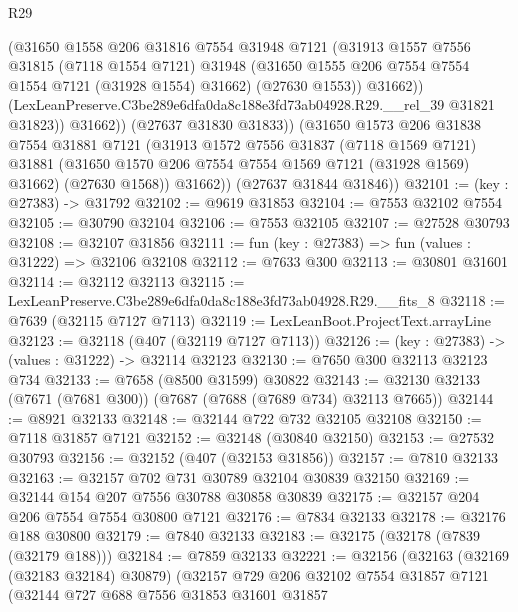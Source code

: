 \begin{lexlean}{R29}
\begin{coremodule}
                  (@31650
                    @1558
                    @206
                    @31816
                    @7554
                    @31948
                    @7121
                    (@31913
                      @1557
                      @7556
                      @31815
                      (@7118 @1554 @7121)
                      @31948
                      (@31650 @1555 @206 @7554 @7554 @1554 @7121 (@31928 @1554) @31662)
                      (@27630 @1553))
                    @31662))
                (LexLeanPreserve.C3be289e6dfa0da8c188e3fd73ab04928.R29.__rel_39 @31821 @31823))
              @31662))
          (@27637 @31830 @31833))
        (@31650
          @1573
          @206
          @31838
          @7554
          @31881
          @7121
          (@31913
            @1572
            @7556
            @31837
            (@7118 @1569 @7121)
            @31881
            (@31650 @1570 @206 @7554 @7554 @1569 @7121 (@31928 @1569) @31662)
            (@27630 @1568))
          @31662))
      (@27637 @31844 @31846))
@32101 := (key : @27383) -> @31792
@32102 := @9619 @31853
@32104 := @7553 @32102 @7554
@32105 := @30790 @32104
@32106 := @7553 @32105
@32107 := @27528 @30793
@32108 := @32107 @31856
@32111 := fun (key : @27383) => fun (values : @31222) => @32106 @32108
@32112 := @7633 @300
@32113 := @30801 @31601
@32114 := @32112 @32113
@32115 := LexLeanPreserve.C3be289e6dfa0da8c188e3fd73ab04928.R29.__fits_8
@32118 := @7639 (@32115 @7127 @7113)
@32119 := LexLeanBoot.ProjectText.arrayLine
@32123 := @32118 (@407 (@32119 @7127 @7113))
@32126 := (key : @27383) -> (values : @31222) -> @32114 @32123
@32130 := @7650 @300 @32113 @32123 @734
@32133 := @7658 (@8500 @31599) @30822
@32143 := @32130 @32133 (@7671 (@7681 @300)) (@7687 (@7688 (@7689 @734) @32113 @7665))
@32144 := @8921 @32133
@32148 := @32144 @722 @732 @32105 @32108
@32150 := @7118 @31857 @7121
@32152 := @32148 (@30840 @32150)
@32153 := @27532 @30793
@32156 := @32152 (@407 (@32153 @31856))
@32157 := @7810 @32133
@32163 := @32157 @702 @731 @30789 @32104 @30839 @32150
@32169 := @32144 @154 @207 @7556 @30788 @30858 @30839
@32175 := @32157 @204 @206 @7554 @7554 @30800 @7121
@32176 := @7834 @32133
@32178 := @32176 @188 @30800
@32179 := @7840 @32133
@32183 := @32175 (@32178 (@7839 (@32179 @188)))
@32184 := @7859 @32133
@32221 := @32156
    (@32163
      (@32169 (@32183 @32184) @30879)
      (@32157
        @729
        @206
        @32102
        @7554
        @31857
        @7121
        (@32144
          @727
          @688
          @7556
          @31853
          @31601
          @31857

\end{coremodule}
\end{lexlean}
